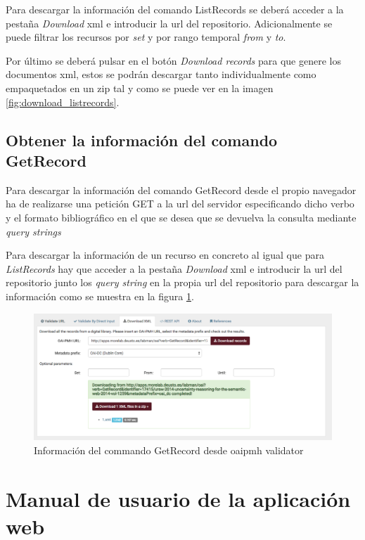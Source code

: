 Para descargar la información del comando ListRecords se deberá acceder a la pestaña \textit{Download} \acrshort{xml} e introducir la \acrshort{url} del repositorio. Adicionalmente se puede filtrar los recursos por \textit{set} y por rango temporal \textit{from} y \textit{to}.

Por último se deberá pulsar en el botón \textit{Download records} para que genere los documentos \acrshort{xml}, estos se podrán descargar tanto individualmente como empaquetados en un zip tal y como se puede ver en la imagen \ref{fig:download_listrecords}.

\subsection{Obtener la información del comando GetRecord}

Para descargar la información del comando GetRecord desde el propio navegador ha de realizarse una petición GET a la \acrshort{url} del servidor especificando dicho verbo y el formato bibliográfico en el que se desea que se devuelva la consulta mediante \textit{query strings}

Para descargar la información de un recurso en concreto al igual que para \textit{ListRecords} hay que acceder a la pestaña \textit{Download} \acrshort{xml} e introducir la url del repositorio junto los \textit{query string} en la propia \acrshort{url} del repositorio para descargar la información como se muestra en la figura \ref{fig:download_getrecord}.

\begin{figure}[!htbp]
	\centering
	\includegraphics[scale=0.31]{fig/download_oai/download_getrecord}
	\caption{Información del commando GetRecord desde \acrshort{oaipmh} validator}
	\label{fig:download_getrecord}
\end{figure}

\section{Manual de usuario de la aplicación web}

